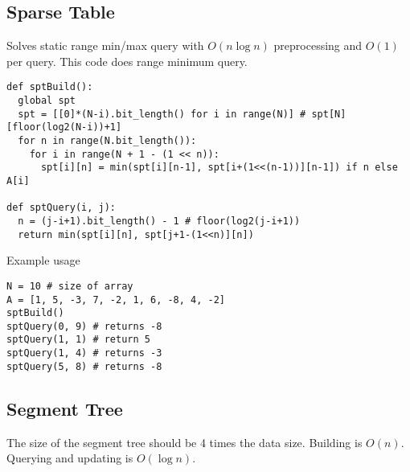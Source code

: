 \documentclass[letterpaper]{article}
\begin{document}
\subsection{Sparse Table}

Solves static range min/max query with $O\left(n\log n\right)$ preprocessing and $O\left(1\right)$ per query. This code does range minimum query.

\begin{lstlisting}
def sptBuild():
  global spt
  spt = [[0]*(N-i).bit_length() for i in range(N)] # spt[N][floor(log2(N-i))+1]
  for n in range(N.bit_length()):
    for i in range(N + 1 - (1 << n)):
      spt[i][n] = min(spt[i][n-1], spt[i+(1<<(n-1))][n-1]) if n else A[i]

def sptQuery(i, j):
  n = (j-i+1).bit_length() - 1 # floor(log2(j-i+1))
  return min(spt[i][n], spt[j+1-(1<<n)][n])
\end{lstlisting}
Example usage
\begin{lstlisting}
N = 10 # size of array
A = [1, 5, -3, 7, -2, 1, 6, -8, 4, -2]
sptBuild()
sptQuery(0, 9) # returns -8
sptQuery(1, 1) # return 5
sptQuery(1, 4) # returns -3
sptQuery(5, 8) # returns -8
\end{lstlisting}

\clearpage

\subsection{Segment Tree}

The size of the segment tree should be 4 times the data size. Building is $O\left(n\right)$. Querying and updating is $O\left(\log n\right)$.
\end{document}
